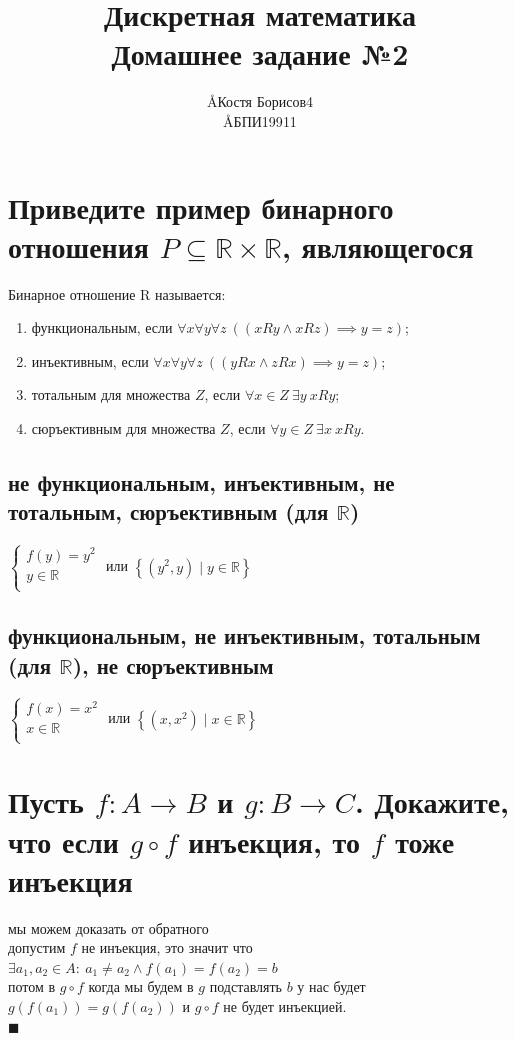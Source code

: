 \documentclass{article}
\title{Дискретная математика \\ Домашнее задание №2}
\author{\AA{Костя Борисов}{4} \\ \AA{БПИ199}{11}}
\newcommand{\R}{\mathbb{R}}
\renewcommand{\l}{\left}
\renewcommand{\r}{\right}
\begin{document}
  \maketitle

  \section{Приведите пример бинарного отношения $P \subseteq \R \times \R$, являющегося}
  Бинарное отношение R называется: %
  \begin{enumerate}
    \item функциональным, если $\forall x\forall y\forall z\ ((xRy \land xRz) \implies y = z)$;
    \item инъективным, если $\forall x\forall y\forall z\ ((yRx \land zRx) \implies y = z)$;
    \item тотальным для множества $Z$, если $\forall x \in Z\ \exists y\ xRy$;
    \item сюръективным для множества $Z$, если $\forall y \in Z\ \exists x\ xRy$.
  \end{enumerate}
  \subsection{не функциональным, инъективным, не тотальным, сюръективным (для $\R$)}
  $\begin{cases}
    f(y) = y^2 \\
    y \in \R \\
  \end{cases}$ или $ \l\{(y^2, y) \mid y \in \R\r\}$
  \subsection{функциональным, не инъективным, тотальным (для $\R$), не сюръективным}
  $\begin{cases}
    f(x) = x^2 \\
    x \in \R \\
  \end{cases}$ или $ \l\{(x, x^2) \mid x \in \R\r\}$

  \section{Пусть $f : A \to B$ и $g : B \to C$. Докажите, что если $g \circ f$ инъекция, то $f$ тоже инъекция}
  мы можем доказать от обратного \\
  допустим $f$ не инъекция, это значит что $\exists a_1,a_2\in A:\ a_1\neq a_2 \land f(a_1)=f(a_2)=b $ \\
  потом в $g \circ f$ когда мы будем в $g$ подставлять $b$ у нас будет $g\l(f\l(a_1\r)\r) = g\l(f\l(a_2\r)\r)$
  и $g \circ f$ не будет инъекцией. \\
  $\blacksquare$
\end{document}
